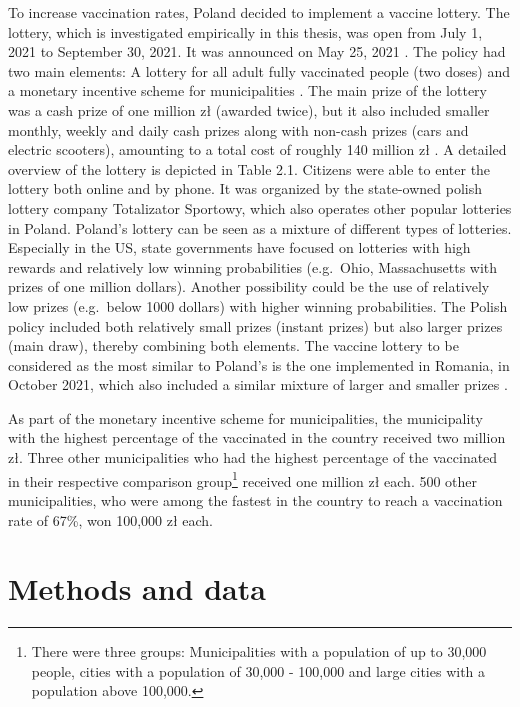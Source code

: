 \documentclass{scrbook}
\begin{document}
To increase vaccination rates, Poland decided to implement a vaccine
lottery. The lottery, which is investigated empirically in this thesis,
was open from July 1, 2021 to September 30, 2021. It was announced on
May 25, 2021 \parencite{charlish_poland_2021}. The policy had two main
elements: A lottery for all adult fully vaccinated people (two doses)
\parencite{service_of_the_republic_of_poland_national_2021} and a
monetary incentive scheme for municipalities
\parencite{service_of_the_republic_of_poland_competitions_2021}. The
main prize of the lottery was a cash prize of one million zł (awarded
twice), but it also included smaller monthly, weekly and daily cash
prizes along with non-cash prizes (cars and electric scooters),
amounting to a total cost of roughly 140 million zł
\parencite{wilczek_poland_2021}. A detailed overview of the lottery is
depicted in Table 2.1. Citizens were able to enter the lottery both
online and by phone. It was organized by the state-owned polish lottery
company Totalizator Sportowy, which also operates other popular
lotteries in Poland. Poland's lottery can be seen as a mixture of
different types of lotteries. Especially in the US, state governments
have focused on lotteries with high rewards and relatively low winning
probabilities (e.g.~Ohio, Massachusetts with prizes of one million
dollars). Another possibility could be the use of relatively low prizes
(e.g.~below 1000 dollars) with higher winning probabilities. The Polish
policy included both relatively small prizes (instant prizes) but also
larger prizes (main draw), thereby combining both elements. The vaccine
lottery to be considered as the most similar to Poland's is the one
implemented in Romania, in October 2021, which also included a similar
mixture of larger and smaller prizes
\parencite{health_ministry_of_romania_press_2021}.

As part of the monetary incentive scheme for municipalities, the
municipality with the highest percentage of the vaccinated in the
country received two million zł. Three other municipalities who had the
highest percentage of the vaccinated in their respective comparison
group\footnote{There were three groups: Municipalities with a population of up to 30,000 people, cities with a population of 30,000 - 100,000 and large cities with a population above 100,000.}
received one million zł each. 500 other municipalities, who were among
the fastest in the country to reach a vaccination rate of 67\%, won
100,000 zł each.

\chapter{Methods and data}
\end{document}
